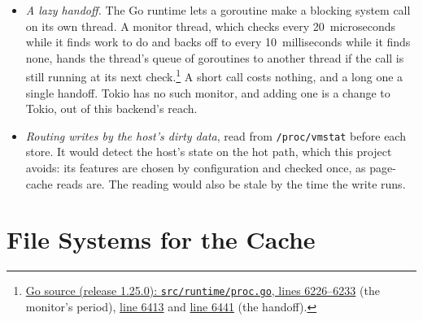 \begin{itemize}
  \item \emph{A lazy handoff.} The Go runtime lets a goroutine make a
    blocking system call on its own thread. A monitor thread, which checks
    every 20~microseconds while it finds work to do and backs off to every
    10~milliseconds while it finds none, hands the thread's queue of
    goroutines to another thread if the call is still running at its next
    check.\footnote{\href{https://github.com/golang/go/blob/go1.25.0/src/runtime/proc.go\#L6226-L6233}{Go
    source (release 1.25.0): \texttt{src/runtime/proc.go}, lines
    6226--6233} (the monitor's period),
    \href{https://github.com/golang/go/blob/go1.25.0/src/runtime/proc.go\#L6413}{line
    6413} and
    \href{https://github.com/golang/go/blob/go1.25.0/src/runtime/proc.go\#L6441}{line
    6441} (the handoff).} A short call costs nothing, and a long one a
    single handoff. Tokio has no such monitor, and adding one is a change to
    Tokio, out of this backend's reach.
  \item \emph{Routing writes by the host's dirty data}, read from
    \texttt{/proc/vmstat} before each store. It would detect the host's
    state on the hot path, which this project avoids: its features are
    chosen by configuration and checked once, as page-cache reads are. The
    reading would also be stale by the time the write runs.
\end{itemize}

\section{File Systems for the Cache}
\label{app:executor-fs}

